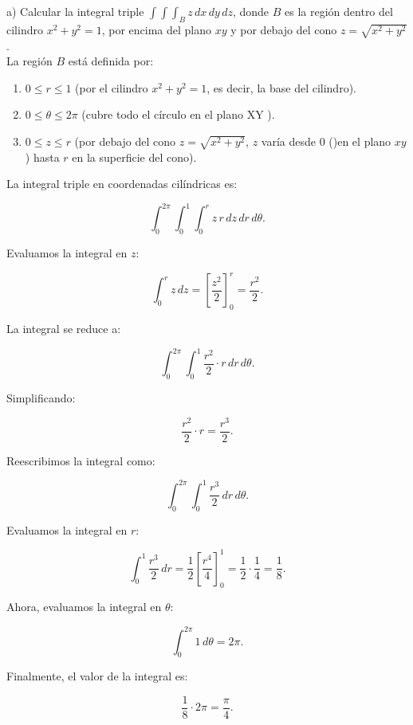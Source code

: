 	a) Calcular la integral triple \( \int \int \int_B z \, dx \, dy \, dz \), donde \( B \) es la región dentro del cilindro \( x^2 + y^2 = 1 \), por encima del plano \( xy \) y por debajo del cono \( z = \sqrt{x^2 + y^2} \).\\
	
	La región \( B \) está definida por:
	
	\begin{enumerate}
		\item  \( 0 \leq r \leq 1 \) (por el cilindro \( x^2 + y^2 = 1 \), es decir, la base del cilindro).
		\item  \( 0 \leq \theta \leq 2\pi \) (cubre todo el círculo en el plano XY ).
		\item  \( 0 \leq z \leq r \) (por debajo del cono \( z = \sqrt{x^2 + y^2} \), \( z \) varía desde 0 ()en el plano \( xy \)) hasta \( r \) en la superficie del cono).
	\end{enumerate}
	
	La integral triple en coordenadas cilíndricas es:
	
	\[
	\int_0^{2\pi} \int_0^1 \int_0^r z \, r \, dz \, dr \, d\theta.
	\]
	
	Evaluamos la integral en \( z \):
	
	\[
	\int_0^r z \, dz = \left[ \frac{z^2}{2} \right]_0^r = \frac{r^2}{2}.
	\]
	
	La integral se reduce a:
	
	\[
	\int_0^{2\pi} \int_0^1 \frac{r^2}{2} \cdot r \, dr \, d\theta.
	\]
	
	Simplificando:
	
	\[
	\frac{r^2}{2} \cdot r = \frac{r^3}{2}.
	\]
	
	Reescribimos la integral como:
	
	\[
	\int_0^{2\pi} \int_0^1 \frac{r^3}{2} \, dr \, d\theta.
	\]
	
	Evaluamos la integral en \( r \):
	
	\[
	\int_0^1 \frac{r^3}{2} \, dr = \frac{1}{2} \left[ \frac{r^4}{4} \right]_0^1 = \frac{1}{2} \cdot \frac{1}{4} = \frac{1}{8}.
	\]
	
	Ahora, evaluamos la integral en \( \theta \):
	
	\[
	\int_0^{2\pi} 1 \, d\theta = 2\pi.
	\]
	
	Finalmente, el valor de la integral es:
	
	\[
	\frac{1}{8} \cdot 2\pi = \boxed {\frac{\pi}{4}}.
	\]
